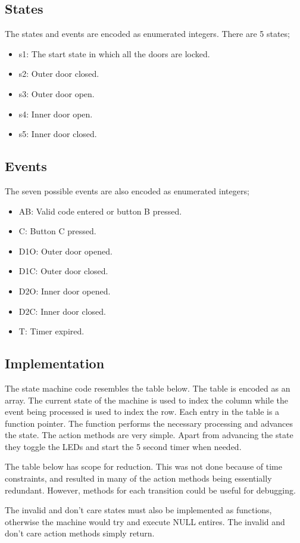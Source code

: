 \documentclass{article}
\begin{document}
\subsection{States}
The states and events are encoded as enumerated integers. There are 5 states;
\begin{itemize}
\item s1: The start state in which all the doors are locked.
\item s2: Outer door closed.
\item s3: Outer door open.
\item s4: Inner door open.
\item s5: Inner door closed.
\end{itemize}
\subsection{Events}
The seven possible events are also encoded as enumerated integers;
\begin{itemize}
\item AB: 	Valid code entered or button B pressed.
\item C:	Button C pressed.
\item D1O:	Outer door opened.
\item D1C:	Outer door closed.
\item D2O:	Inner door opened.
\item D2C:	Inner door closed.
\item T:	Timer expired.
\end{itemize}

\subsection{Implementation}
The state machine code resembles the table below. The table is encoded as an array. The current state of the machine is used to index the column while the event being processed is used to index the row. Each entry in the table is a function pointer. The function performs the necessary processing and advances the state. The action methods are very simple. Apart from advancing the state they toggle the LEDs and start the 5 second timer when needed. 

The table below has scope for reduction. This was not done because of time constraints, and resulted in many of the action methods being essentially redundant. However, methods for each transition could be useful for debugging. 

The invalid and don't care states must also be implemented as functions, otherwise the machine would try and execute NULL entires. The invalid and don't care action methods simply return.
\end{document}
